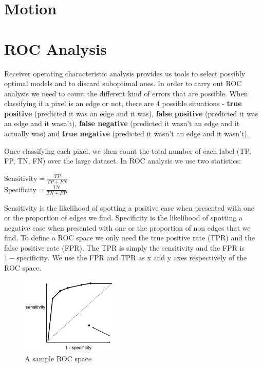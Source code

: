 \documentclass{article}
\begin{document}
	\section{Motion}

	\section{ROC Analysis}
	Receiver operating characteristic analysis provides us tools to select possibly optimal models and to discard suboptimal ones. In order to carry out ROC analysis we need to count the different kind of errors that are possible. When classifying if a pixel is an edge or not, there are 4 possible situations - \textbf{true positive} (predicted it was an edge and it was), \textbf{false positive} (predicted it was an edge and it wasn't), \textbf{false negative} (predicted it wasn't an edge and it actually was) and \textbf{true negative} (predicted it wasn't an edge and it wasn't).
	
Once classifying each pixel, we then count the total number of each label (TP, FP, TN, FN) over the large dataset. In ROC analysis we use two statistics:
	\begin{multicols}{2}
		\noindent
		\centering
			$ \text{Sensitivity} = \frac{TP}{TP+FN}$ \\
			$ \text{Specificity} = \frac{TN}{TN+FP}$
	\end{multicols}	
	Sensitivity is the likelihood of spotting a positive case when presented with one or the proportion of edges we find. Specificity is the likelihood of spotting a negative case when presented with one or the proportion of non edges that we find. To define a ROC space we only need the true positive rate (TPR) and the false positive rate (FPR). The TPR is simply the sensitivity and the FPR is $1 - \text{specificity}$. We use the FPR and TPR as x and y axes respectively of the ROC space.
	
	\begin{figure}
		\centering
		\includegraphics[width=0.4\textwidth]{roc_analysis}
		\caption{A sample ROC space}
		\label{fig:roc_analysis}
	\end{figure}
	
\end{document}
